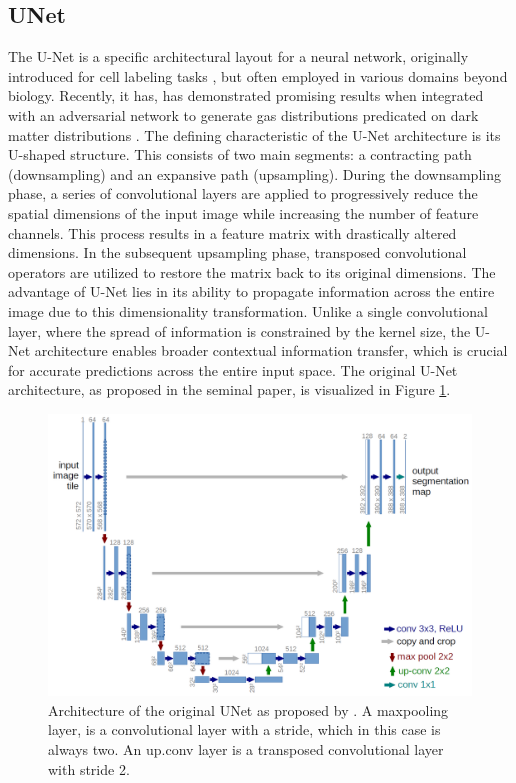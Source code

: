 \documentclass{article}
\begin{document}
\subsection{UNet}

The U-Net is a specific architectural layout for a neural network, originally introduced for cell labeling tasks \citep{ronneberger2015u}, but often employed in various domains beyond biology. Recently, it has, has demonstrated promising results when integrated with an adversarial network to generate gas distributions predicated on dark matter distributions \citep{bernardini2022ember}.
The defining characteristic of the U-Net architecture is its U-shaped structure. This consists of two main segments: a contracting path (downsampling) and an expansive path (upsampling). During the downsampling phase, a series of convolutional layers are applied to progressively reduce the spatial dimensions of the input image while increasing the number of feature channels. This process results in a feature matrix with drastically altered dimensions. In the subsequent upsampling phase, transposed convolutional operators are utilized to restore the matrix back to its original dimensions. The advantage of U-Net lies in its ability to propagate information across the entire image due to this dimensionality transformation. Unlike a single convolutional layer, where the spread of information is constrained by the kernel size, the U-Net architecture enables broader contextual information transfer, which is crucial for accurate predictions across the entire input space. The original U-Net architecture, as proposed in the seminal paper, is visualized in Figure \ref{fig:unet}.
\begin{figure}[h]
    \centering
    \includegraphics[width=0.8\linewidth]{img/unet.png}
    \caption{Architecture of the original UNet as proposed by \cite{ronneberger2015u}. A maxpooling layer, is a convolutional layer with a stride, which in this case is always two. An up.conv layer is a transposed convolutional layer with stride 2. }
    \label{fig:unet}
\end{figure}
    
\end{document}
